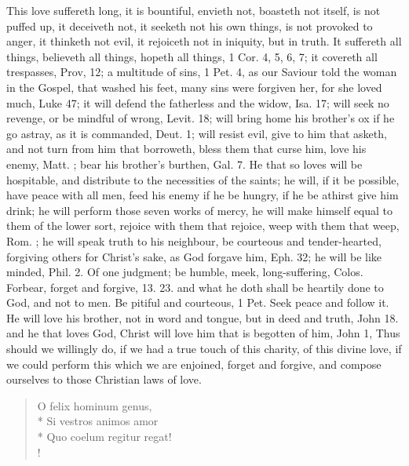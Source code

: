 {This love suffereth long, it is bountiful, envieth not, boasteth not
itself, is not puffed up, it deceiveth not, it seeketh not his own
things, is not provoked to anger, it thinketh not evil, it rejoiceth
not in iniquity, but in truth. It suffereth all things, believeth all
things, hopeth all things, 1 Cor.  4, 5, 6, 7; it covereth all
trespasses, Prov,  12; a multitude of sins, 1 Pet. 4, as our Saviour
told the woman in the Gospel, that washed his feet, many sins were
forgiven her, for she loved much, Luke  47; it will defend the
fatherless and the widow, Isa.  17; will seek no revenge, or be
mindful of wrong, Levit.  18; will bring home his brother's ox if
he go astray, as it is commanded, Deut.  1; will resist evil, give
to him that asketh, and not turn from him that borroweth, bless them
that curse him, love his enemy, Matt. ; bear his brother's burthen,
Gal.  7. He that so loves will be hospitable, and distribute to the
necessities of the saints; he will, if it be possible, have peace with
all men, feed his enemy if he be hungry, if he be athirst give him
drink; he will perform those seven works of mercy, he will make himself
equal to them of the lower sort, rejoice with them that rejoice, weep
with them that weep, Rom. ; he will speak truth to his neighbour, be
courteous and tender-hearted, forgiving others for Christ's sake, as
God forgave him, Eph.  32; he will be like minded, Phil.  2. Of
one judgment; be humble, meek, long-suffering, Colos.  Forbear,
forget and forgive,  13. 23. and what he doth shall be heartily
done to God, and not to men. Be pitiful and courteous, 1 Pet.  Seek
peace and follow it. He will love his brother, not in word and tongue,
but in deed and truth, John  18. and he that loves God, Christ will
love him that is begotten of him, John  1, \etc{} Thus should we
willingly do, if we had a true touch of this charity, of this divine
love, if we could perform this which we are enjoined, forget and
forgive, and compose ourselves to those Christian laws of love.
%
\begin{latin}
\begin{verse}
O felix hominum genus,\\*
Si vestros animos amor\\*
Quo coelum regitur regat!\\!
\end{verse}
\end{latin}

}
